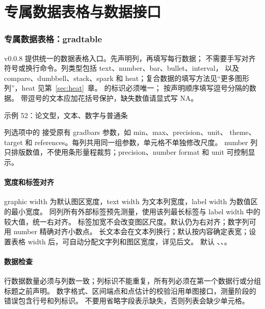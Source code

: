 \part{专属数据表格与数据接口}


\section{专属数据表格：gradtable}
v0.0.8 提供统一的数据表格入口。先声明列，再填写每行数据；
不需要手写对齐符号或换行命令。列类型包括 text、number、bar、bullet、interval，
以及 compare、dumbbell、stack、spark 和 heat；复合数据的填写方法见“更多图形列”，heat 见第~\ref{sec:heat}~章。
 的标识必须唯一；
 按声明顺序填写逗号分隔的数据。
带逗号的文本应加花括号保护，缺失数值请显式写 NA。

\begin{example}[text and listing,sidebyside=false]{示例 52：论文型，文本、数字与普通条}
\begin{center}
\begin{gradtable}[align=c,header align=c,preset=paper,graphic width=48mm,
  text width=24mm,label width=14mm]
\end{gradtable}
\end{center}
\end{example}
列选项中的  接受原有 gradbars 参数，如 min、max、precision、unit、
theme、target 和 references。每列共用同一组参数，单元格不单独修改尺度。
number 列只排版数值，不使用条形量程裁剪；precision、number format 和 unit 可控制显示。

\subsection{宽度和标签对齐}
graphic width 为默认图区宽度，text width 为文本列宽度，label width 为数值区的最小宽度。
同列所有外部标签预先测量，使用该列最长标签与 label width 中的较大值，统一右对齐。
标签加宽不会改变图区尺度。默认仍为右对齐；数字列可用 number  精确对齐小数点。
长文本会在文本列换行；默认按内容确定表宽；设置表格 width 后，可自动分配文字列和图区宽度，详见后文。
默认 、、。

\subsection{数据检查}
行数据数量必须与列数一致；列标识不能重复，所有列必须在第一个数据行或分组标题之前声明。
数字格式、区间端点和点估计的校验沿用单图接口，测量阶段的错误包含行号和列标识。
不要用省略字段表示缺失，否则列表会缺少单元格。

